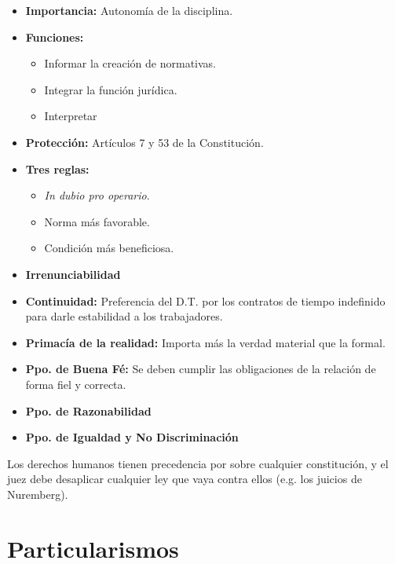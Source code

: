 \documentclass[../main.tex]{subfiles}
\begin{document}
\begin{itemize}
	\item \textbf{Importancia:} Autonomía de la disciplina.
	
	\item \textbf{Funciones:}
		\begin{itemize}
			\item Informar la creación de normativas.
			\item Integrar la función jurídica.
			\item Interpretar
		\end{itemize}
	
	\item \textbf{Protección:} Artículos 7 y 53 de la Constitución.
	
	\item \textbf{Tres reglas:} %
		\begin{itemize}
			\item \textit{In dubio pro operario}.
			\item Norma más favorable.
			\item Condición más beneficiosa.
		\end{itemize}
	
	\item \textbf{Irrenunciabilidad}
	
	\item \textbf{Continuidad:} Preferencia del D.T. por los contratos de tiempo indefinido para darle estabilidad a los trabajadores.
	
	\item \textbf{Primacía de la realidad:} Importa más la verdad material que la formal.
	
	\item \textbf{Ppo. de Buena Fé:} Se deben cumplir las obligaciones de la relación de forma fiel y correcta.
	
	\item \textbf{Ppo. de Razonabilidad}
	
	\item \textbf{Ppo. de Igualdad y No Discriminación}
\end{itemize}

Los derechos humanos tienen precedencia por sobre cualquier constitución, y el juez debe desaplicar cualquier ley que vaya contra ellos (e.g. los juicios de Nuremberg).

\section{Particularismos}
\end{document}
